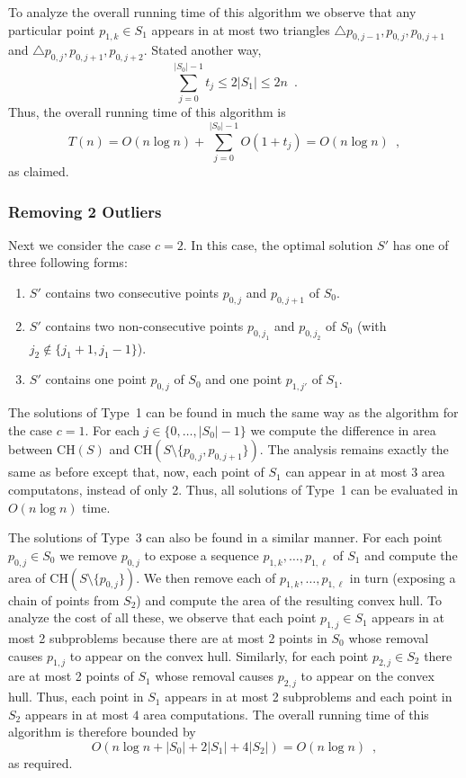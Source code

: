 \documentclass[lotsofwhite]{patmorin}
\newcommand{\ch}{\mathrm{CH}}
\begin{document}
To analyze the overall running time of this algorithm we observe that
any particular point $p_{1,k}\in S_1$ appears in at most two triangles
$\triangle p_{0,j-1},p_{0,j},p_{0,j+1}$ and
$\triangle p_{0,j},p_{0,j+1},p_{0,j+2}$.  Stated another way,
\[
     \sum_{j=0}^{|S_0|-1} t_j \le 2|S_1|\le 2n \enspace .
\]
Thus, the overall running time of this algorithm is
\[
     T(n) = O(n\log n)+\sum_{j=0}^{|S_0|-1} O(1+t_j) = O(n\log n) \enspace ,
\]
as claimed.

\subsubsection{Removing 2 Outliers}

Next we consider the case $c=2$.  In this case, the optimal solution
$S'$ has one of three following forms:

\begin{enumerate}

\item $S'$ contains two consecutive points $p_{0,j}$ and $p_{0,j+1}$
of $S_0$.

\item $S'$ contains two non-consecutive points $p_{0,j_1}$ and
$p_{0,j_2}$ of $S_0$ (with $j_2\not\in\{j_1+1,j_1-1\}$).

\item $S'$ contains one point $p_{0,j}$ of $S_0$ and one point
$p_{1,j'}$ of $S_1$.

\end{enumerate}

The solutions of Type~1 can be found in much the same way as the
algorithm for the case $c=1$.  For each $j\in\{0,\ldots,|S_0|-1\}$ we
compute the difference in area between $\ch(S)$ and
$\ch(S\setminus\{p_{0,j},p_{0,j+1}\})$.  The analysis remains exactly
the same as before except that, now, each point of $S_1$ can appear in
at most $3$ area computatons, instead of only 2.  Thus, all solutions
of Type~1 can be evaluated in $O(n\log n)$ time.

The solutions of Type~3 can also be found in a similar manner.  For
each point $p_{0,j}\in S_0$ we remove $p_{0,j}$ to expose a sequence
$p_{1,k},\ldots,p_{1,\ell}$ of $S_1$ and compute the area of
$\ch(S\setminus\{p_{0,j}\})$.  We then remove each of
$p_{1,k},\ldots,p_{1,\ell}$ in turn (exposing a chain of points from
$S_2$) and compute the area of the resulting convex hull.  To analyze
the cost of all these, we observe that each point $p_{1,j}\in S_1$
appears in at most 2 subproblems because there are at most 2 points in
$S_0$ whose removal causes $p_{1,j}$ to appear on the convex hull.
Similarly, for each point $p_{2,j}\in S_2$ there are at most 2 points
of $S_1$ whose removal causes $p_{2,j}$ to appear on the convex hull.
Thus, each point in $S_1$ appears in at most 2 subproblems and each
point in $S_2$ appears in at most $4$ area computations.  The overall
running time of this algorithm is therefore bounded by
\[
    O\left(n\log n + |S_0| + 2|S_1| + 4|S_2|\right) = O(n\log n) \enspace ,
\]
as required.
\end{document}
